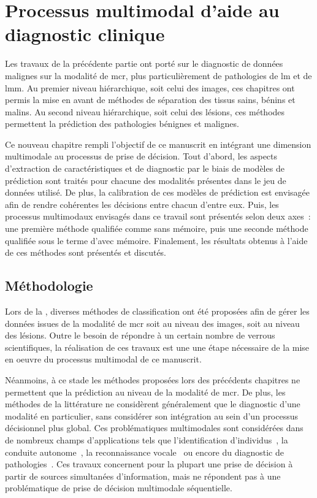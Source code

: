 \renewcommand{\thechapter}{\arabic{chapter}}
\setcounter{chapter}{7}

\chapter{Processus multimodal d'aide au diagnostic clinique}
\label{chap:chapter_8}
\chapterintro
Les travaux de la précédente partie ont porté sur le diagnostic de données malignes sur la modalité de \acrlong{mcr}, plus particulièrement de pathologies de \acrlong{lm} et de \acrlong{lmm}. Au premier niveau hiérarchique, soit celui des images, ces chapitres ont permis la mise en avant de méthodes de séparation des tissus sains, bénins et malins. Au second niveau hiérarchique, soit celui des lésions, ces méthodes permettent la prédiction des pathologies bénignes et malignes.\par

Ce nouveau chapitre rempli l'objectif de ce manuscrit en intégrant une dimension multimodale au processus de prise de décision. Tout d'abord, les aspects d'extraction de caractéristiques et de diagnostic par le biais de modèles de prédiction sont traités pour chacune des modalités présentes dans le jeu de données utilisé. De plus, la calibration de ces modèles de prédiction est envisagée afin de rendre cohérentes les décisions entre chacun d’entre eux. Puis, les processus multimodaux envisagés dans ce travail sont présentés selon deux axes~: une première méthode qualifiée comme sans mémoire, puis une seconde méthode qualifiée sous le terme d’avec mémoire. Finalement, les résultats obtenus à l'aide de ces méthodes sont présentés et discutés.\par
\newpage

\section{Méthodologie}
Lors de la , diverses méthodes de classification ont été proposées afin de gérer les données issues de la modalité de \gls{mcr} soit au niveau des images, soit au niveau des lésions. Outre le besoin de répondre à un certain nombre de verrous scientifiques, la réalisation de ces travaux est une une étape nécessaire de la mise en oeuvre du processus multimodal de ce manuscrit.\par

Néanmoins, à ce stade les méthodes proposées lors des précédents chapitres ne permettent que la prédiction au niveau de la modalité de \gls{mcr}. De plus, les méthodes de la littérature ne considèrent généralement que le diagnostic d'une modalité en particulier, sans considérer son intégration au sein d'un processus décisionnel plus global. Ces problématiques multimodales sont considérées dans de nombreux champs d'applications tels que l'identification d'individus~\cite{Lupu2008}, la conduite autonome~\cite{Xiao2019}, la reconnaissance vocale~\cite{Ngiam2011} ou encore du diagnostic de pathologies~\cite{Lim2014, Liu2015a}. Ces travaux concernent pour la plupart une prise de décision à partir de sources simultanées d'information, mais ne répondent pas à une problématique de prise de décision multimodale séquentielle.\par

